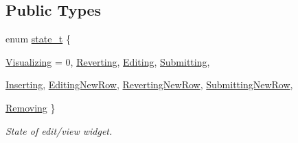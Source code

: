 \subsection*{Public Types}
\begin{DoxyCompactItemize}
\item 
enum \hyperlink{classmdt_abstract_sql_widget_a54e6a7f2b41fb3edfa1e4ed62abf4072}{state\_\-t} \{ \par
\hyperlink{classmdt_abstract_sql_widget_a54e6a7f2b41fb3edfa1e4ed62abf4072ae067e0561127490a4af5a28e844169a2}{Visualizing} =  0, 
\hyperlink{classmdt_abstract_sql_widget_a54e6a7f2b41fb3edfa1e4ed62abf4072a8be2fce90475c910b73cab2734bbe451}{Reverting}, 
\hyperlink{classmdt_abstract_sql_widget_a54e6a7f2b41fb3edfa1e4ed62abf4072a20fe5aac135b77990ad4a01a54ded05d}{Editing}, 
\hyperlink{classmdt_abstract_sql_widget_a54e6a7f2b41fb3edfa1e4ed62abf4072a2e228922d30b9b89056da058a84e5957}{Submitting}, 
\par
\hyperlink{classmdt_abstract_sql_widget_a54e6a7f2b41fb3edfa1e4ed62abf4072af142155e59e6ec8b6575ad69f0386448}{Inserting}, 
\hyperlink{classmdt_abstract_sql_widget_a54e6a7f2b41fb3edfa1e4ed62abf4072ad9d8094cd8165836394cac84adab6e65}{EditingNewRow}, 
\hyperlink{classmdt_abstract_sql_widget_a54e6a7f2b41fb3edfa1e4ed62abf4072a6813a05df165990ab8d72121a1770cec}{RevertingNewRow}, 
\hyperlink{classmdt_abstract_sql_widget_a54e6a7f2b41fb3edfa1e4ed62abf4072ad849c45d862423a014e8bf89a3468d0c}{SubmittingNewRow}, 
\par
\hyperlink{classmdt_abstract_sql_widget_a54e6a7f2b41fb3edfa1e4ed62abf4072aa5a44e5bb56cfe1dcd90af9097749697}{Removing}
 \}
\begin{DoxyCompactList}\small\item\em State of edit/view widget. \end{DoxyCompactList}\end{DoxyCompactItemize}
